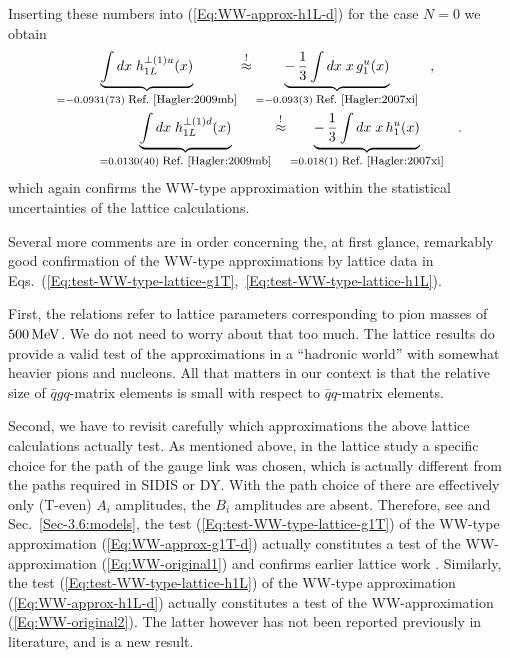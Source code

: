 \documentclass[a4paper,11pt]{article}
\newcommand{\ba}{\begin{eqnarray}}
\newcommand{\ea}{\end{eqnarray}}
\begin{document}
Inserting these numbers into  (\ref{Eq:WW-approx-h1L-d}) for the case
$N=0$ we obtain
\ba
        \underbrace{\int d x\;h_{1L}^{\perp(1)u}(x)}
        _{= -0.0931(73)\;\mbox{\footnotesize Ref.~\cite{Hagler:2009mb}}}
        \stackrel{!}{\approx}
        \underbrace{-\,\frac{1}{3}\int d x\;x\,g_1^u(x)}
        _{= -0.093(3) \;\mbox{\footnotesize Ref.~\cite{Hagler:2007xi}}}
        \hspace{3mm} , \hspace{7mm} \nonumber \\
        \underbrace{\int d x\;h_{1L}^{\perp(1)d}(x)}
        _{= 0.0130(40) \;\mbox{\footnotesize Ref.~\cite{Hagler:2009mb}}}
        \stackrel{!}{\approx}
        \underbrace{-\,\frac{1}{3}\int d x\;x\,h_1^u(x)}
        _{= 0.018(1) \;\mbox{\footnotesize Ref.~\cite{Hagler:2007xi}}}
        \hspace{3mm}. 
        \label{Eq:test-WW-type-lattice-h1L}
\ea
which again confirms the WW-type approximation within the statistical
uncertainties of the lattice calculations.

Several more comments are in order concerning the, at first glance, remarkably
good confirmation of the  WW-type approximations by lattice data in
Eqs.~(\ref{Eq:test-WW-type-lattice-g1T},~\ref{Eq:test-WW-type-lattice-h1L}).

First, the relations refer to lattice parameters corresponding
to pion masses of $500\,{\rm MeV}$. We do not
need to worry about that too much. The lattice results do provide
a valid test of the approximations in a ``hadronic world'' with
somewhat heavier pions and nucleons. All that matters in our
context is that the relative size of $\bar qgq$-matrix elements
is small with respect to $\bar qq$-matrix elements.

Second, we have to revisit carefully which approximations the above
lattice calculations actually test. As mentioned above, in
the lattice study \cite{Hagler:2007xi} a specific choice for
the path of the gauge link was chosen, which is actually different
from the paths required in SIDIS or DY. With the path choice of
\cite{Hagler:2007xi} there are effectively only (T-even)
$A_i$ amplitudes, the $B_i$ amplitudes are absent.
Therefore, see \cite{Metz:2008ib,Teckentrup:2009tk} and
Sec.~\ref{Sec-3.6:models},
the test (\ref{Eq:test-WW-type-lattice-g1T}) of the WW-type
approximation (\ref{Eq:WW-approx-g1T-d}) actually constitutes a test
of the WW-approximation (\ref{Eq:WW-original1}) and confirms
earlier lattice work \cite{Gockeler:2000ja,Gockeler:2005vw}.
Similarly, the test (\ref{Eq:test-WW-type-lattice-h1L}) of the
WW-type approximation (\ref{Eq:WW-approx-h1L-d}) actually constitutes
a test of the WW-approximation (\ref{Eq:WW-original2}). The latter
however has not been reported previously in literature, and is a
new result.
\end{document}
